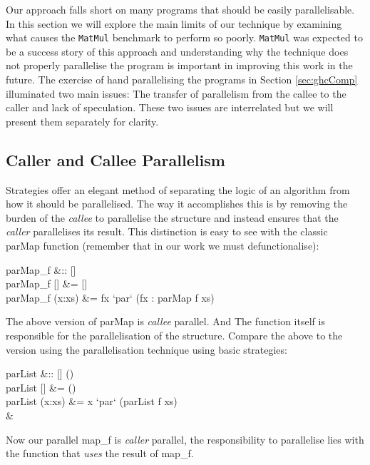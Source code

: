 Our approach falls short on many programs that should be easily parallelisable.
In this section we will explore the main limits of our technique by examining
what causes the \verb|MatMul| benchmark to perform so poorly. \verb|MatMul| was
expected to be a success story of this approach and understanding why the
technique does not properly parallelise the program is important in improving
this work in the future. The exercise of hand parallelising the programs in
Section \ref{sec:ghcComp} illuminated two main issues: The transfer of parallelism
from the callee to the caller and lack of speculation. These two issues are interrelated
but we will present them separately for clarity.

\subsection{Caller and Callee Parallelism}

Strategies offer an elegant method of separating the logic of an algorithm from
how it should be parallelised. The way it accomplishes this is by removing the
burden of the \emph{callee} to parallelise the structure and instead ensures
that the \emph{caller} parallelises its result. This distinction is easy to see
with the classic \<parMap\> function (remember that in our work we must
defunctionalise):

\begin{haskell}
parMap_{f} &:: [\hasalpha] \to [\hasbeta] \\
parMap_{f} []     &= [] \\
parMap_{f} (x:xs) &= fx `par` (fx : parMap f xs) 
\end{haskell}

The above version of \<parMap\> is \emph{callee} parallel. And The function itself is
responsible for the parallelisation of the structure. Compare the above to the
version using the parallelisation technique using basic strategies:

\begin{haskell}
parList &:: [\hasalpha] \to () \\
parList []     &= () \\
parList (x:xs) &= x `par` (parList f xs)\\
\quad & \quad \\
\end{haskell}

Now our parallel \<map_{f}\> is \emph{caller} parallel, the responsibility to
parallelise lies with the function that \emph{uses} the result of \<map_{f}\>.

